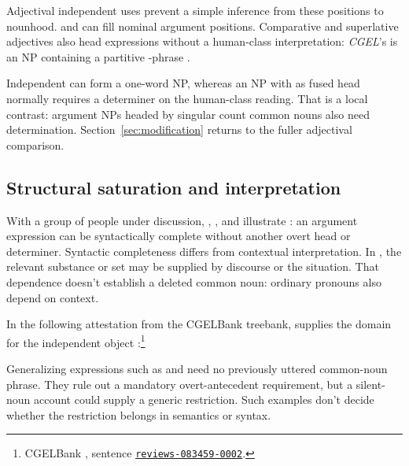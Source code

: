 \documentclass[12pt]{article}
\begin{document}
Adjectival independent uses prevent a simple inference from these positions to nounhood.  and  can fill nominal argument positions. Comparative and superlative adjectives also head expressions without a human-class interpretation: \textit{CGEL}'s  is an NP containing a partitive -phrase \citep[332--333, 416--423]{huddleston2002}.

Independent  can form a one-word NP, whereas an NP with  as fused head normally requires a determiner on the human-class reading. That is a local contrast: argument NPs headed by singular count common nouns also need determination. Section~\ref{sec:modification} returns to the fuller adjectival comparison.

\subsection{Structural saturation and interpretation}

With a group of people under discussion, , , and  illustrate : an argument expression can be syntactically complete without another overt head or determiner. Syntactic completeness differs from contextual interpretation. In , the relevant substance or set may be supplied by discourse or the situation. That dependence doesn't establish a deleted common noun: ordinary pronouns also depend on context.

In the following attestation from the CGELBank treebank,  supplies the domain for the independent object :\footnote{CGELBank \citep{reynolds2023unified}, sentence \href{https://github.com/nert-nlp/cgel/blob/d0a2c2d8c522b23d5aa879fc9cb94948f4285b2c/datasets/ewt.cgel\#L651-L654}{\nolinkurl{reviews-083459-0002}}.}
\ea\label{ex:attested-both}
\z

Generalizing expressions such as  and  need no previously uttered common-noun phrase. They rule out a mandatory overt-antecedent requirement, but a silent-noun account could supply a generic restriction. Such examples don't decide whether the restriction belongs in semantics or syntax.
\end{document}

